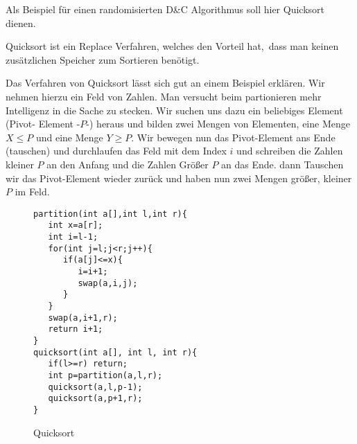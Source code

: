 Als Beispiel für einen randomisierten D\&C Algorithmus soll hier Quicksort dienen.

Quicksort ist ein Replace Verfahren, welches den Vorteil hat, \,dass man keinen \,zusätzlichen Speicher zum Sortieren benötigt.

Das Verfahren von Quicksort lässt sich gut an einem Beispiel erklären.
Wir nehmen hierzu ein Feld von Zahlen.
Man versucht beim partionieren mehr Intelligenz in die Sache zu stecken.
Wir suchen uns dazu ein beliebiges Element (Pivot- Element -$P$-) heraus und bilden zwei Mengen von Elementen, eine Menge $X\le P$ und eine Menge $Y\ge P$. Wir bewegen nun das Pivot-Element ans Ende (tauschen) und durchlaufen das Feld mit dem Index $i$ und schreiben die Zahlen kleiner $P$ an den Anfang und die Zahlen Größer $P$ an das Ende.
dann Tauschen wir das Pivot-Element wieder zurück und haben nun zwei Mengen größer, kleiner $P$ im Feld.
\begin{figure}[H]
\begin{verbatim}
partition(int a[],int l,int r){
   int x=a[r];
   int i=l-1;
   for(int j=l;j<r;j++){
      if(a[j]<=x){
         i=i+1;
         swap(a,i,j);
      }
   }
   swap(a,i+1,r);
   return i+1;
}
quicksort(int a[], int l, int r){
   if(l>=r) return;
   int p=partition(a,l,r);
   quicksort(a,l,p-1);
   quicksort(a,p+1,r);
}
\end{verbatim}
\caption{Quicksort}
\end{figure}
